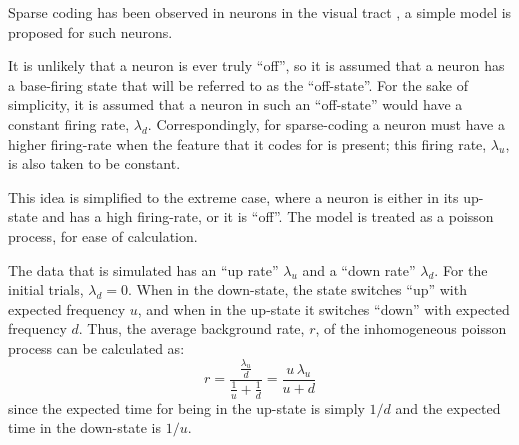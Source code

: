 Sparse coding has been observed in neurons in the visual tract \citep{OlshausenField2004a}, a simple model is proposed for such neurons.

It is unlikely that a neuron is ever truly ``off'', so it is assumed that a neuron has a base-firing state that will be referred to as the ``off-state''.  For the sake of simplicity, it is assumed that a neuron in such an ``off-state'' would have a constant firing rate, $\lambda_d$.  Correspondingly, for sparse-coding a neuron must have a higher firing-rate when the feature that it codes for is present; this firing rate, $\lambda_u$, is also taken to be constant.


This idea is simplified to the extreme case, where a neuron is either in its up-state and has a high firing-rate, or it is ``off''.   The model is treated as a poisson process, for ease of calculation.


The data that is simulated has an ``up rate'' $\lambda_u$ and a ``down rate'' $\lambda_d$.  For the initial trials, $\lambda_d = 0$.  When in the down-state, the state switches ``up'' with expected frequency $u$, and when in the up-state it switches ``down'' with expected frequency $d$.  Thus, the average background rate, $r$, of the inhomogeneous poisson process can be calculated as:
\begin{equation}\label{lam}
r = \frac{ \frac{\lambda_u }{d}}{ \frac{1}{u} + \frac{1}{d}} = \frac{u\, \lambda_u}{u+d}
\end{equation}
since the expected time for being in the up-state is simply $1/d$ and the expected time in the down-state is $1/u$.

